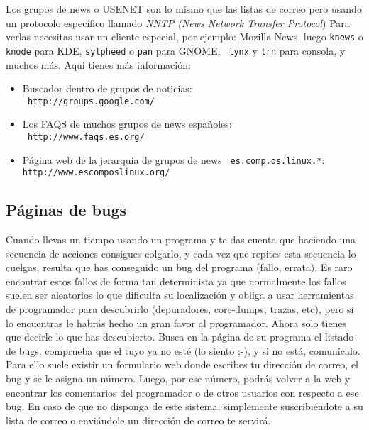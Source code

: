 Los grupos de news o USENET son lo mismo que las listas de correo pero
usando  un  protocolo  específico  llamado  {\em  NNTP  (News  Network
Transfer Protocol})  Para verlas  necesitas usar un  cliente especial,
por ejemplo: {\sf Mozilla News},  luego {\tt knews} o {\tt knode}
para {\sf  KDE}, {\tt  sylpheed} o  {\tt pan}  para {\sf  GNOME}, {\tt
lynx}  y  {\tt trn}  para  consola,  y  muchos  más. Aquí  tienes  más
información:

\begin{itemize}

\item   Buscador    dentro   de   grupos   de    noticias:   \\   {\tt
http://groups.google.com/}

\item  Los  FAQS   de  muchos  grupos  de  news   españoles:  \\  {\tt
http://www.faqs.es.org/}

\item   Página  web   de  la   jerarquia  de   grupos  de   news  {\tt
es.comp.os.linux.{*}}: \\ {\tt http://www.escomposlinux.org/}

\end{itemize}

\subsection{Páginas de bugs}

Cuando  llevas un  tiempo  usando  un programa  y  te  das cuenta  que
haciendo una secuencia de acciones  consigues colgarlo, y cada vez que
repites esta secuencia  lo cuelgas, resulta que has  conseguido un bug
del programa (fallo, errata). Es  raro encontrar estos fallos de forma
tan determinista ya  que normalmente los fallos  suelen ser aleatorios
lo  que dificulta  su localización  y  obliga a  usar herramientas  de
programador para  descubrirlo (depuradores, core-dumps,  trazas, etc),
pero si  lo encuentras le habrás  hecho un gran favor  al programador.
Ahora solo  tienes que  decirle lo  que has  descubierto. Busca  en la
página de su programa el listado de  bugs, comprueba que el tuyo ya no
esté (lo siento ;-), y si no está, comunícalo. Para ello suele existir
un formulario web  donde escribes tu dirección de correo,  el bug y se
le asigna un número.  Luego, por ese número, podrás volver  a la web y
encontrar  los comentarios  del programador  o de  otros usuarios  con
respecto  a ese  bug. En  caso  de que  no disponga  de este  sistema,
simplemente  suscribiéndote  a su  lista  de  correo o  enviándole  un
dirección de correo te servirá.

